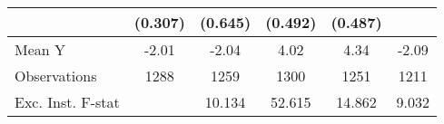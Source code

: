 {\begin{tabular}{l*{5}{c}}
            &     (0.307)         &     (0.645)         &     (0.492)         &     (0.487)         &                     \\
\midrule
Mean Y      &       -2.01         &       -2.04         &        4.02         &        4.34         &       -2.09         \\
Observations&        1288         &        1259         &        1300         &        1251         &        1211         \\
Exc. Inst. F-stat&                     &      10.134         &      52.615         &      14.862         &       9.032         \\
\bottomrule
\end{tabular}
}
